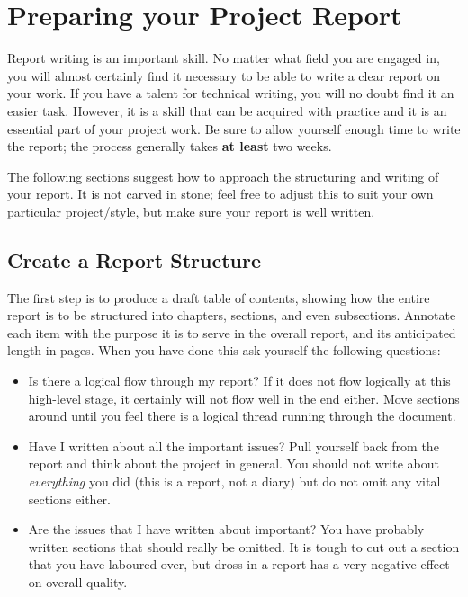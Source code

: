 \documentclass[]{final_report}
\begin{document}
\chapter{Preparing your Project Report}

Report writing is an important skill. No matter what field you are engaged in, you will almost certainly find it necessary to be able to write a clear report on your work. If you have a talent for technical writing, you will no doubt find it an easier task. However, it is a skill that can be acquired with practice and it is an essential part of your project work. Be sure to allow yourself enough time to write the report; the process generally takes {\bf at least} two weeks. 

The following sections suggest how to approach the structuring and writing of your report. It is not carved in stone; feel free to adjust this to suit your own particular project/style, but make sure your report is well written.

\section{Create a Report Structure}

The first step is to produce a draft table of contents, showing how the entire report is to be structured into chapters, sections, and even subsections. Annotate each item with the purpose it is to serve in the overall report, and its anticipated length in pages. When you have done this ask yourself the following questions:

\begin{itemize}
\item Is there a logical flow through my report? If it does not flow logically at this high-level stage, it certainly will not flow well in the end either. Move sections around until you feel there is a logical thread running through the document.
\item Have I written about all the important issues? Pull yourself back from the report and think about the project in general. You should not write about {\sl everything} you did (this is a report, not a diary) but do not omit any vital sections either.
\item Are the issues that I have written about important? You have probably written sections that should really be omitted. It is tough to cut out a section that you have laboured over, but dross in a report has a very negative effect on overall quality.
\end{itemize}
\end{document}
